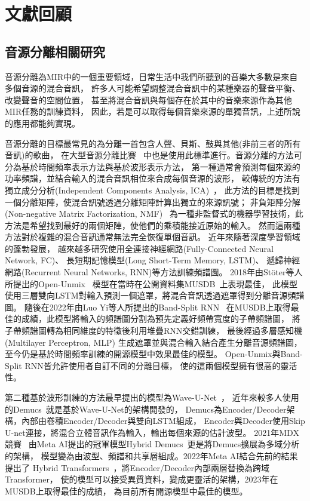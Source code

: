 \documentclass[class=NCU_thesis, crop=false]{standalone}
\begin{document}
\pagebreak

\section{文獻回顧}
\subsection{音源分離相關研究}
音源分離為MIR中的一個重要領域，日常生活中我們所聽到的音樂大多數是來自多個音源的混合音訊，
許多人可能希望調整混合音訊中的某種樂器的聲音平衡、改變聲音的空間位置，
甚至將混合音訊與每個存在於其中的音樂來源作為其他MIR任務的訓練資料，
因此，若是可以取得每個音樂來源的單獨音訊，上述所說的應用都能夠實現。

音源分離的目標最常見的為分離一首包含人聲、貝斯、鼓與其他(非前三者的所有音訊)的歌曲，
在大型音源分離比賽~\cite{Yuki_Mitsufuji2021MusicDemixing, Fabbro_Giorgio2023TheSoundDemixing}
中也是使用此標準進行。音源分離的方法可分為基於時間頻率表示方法與基於波形表示方法，
第一種通常會預測每個來源的功率頻譜，並結合輸入的混合音訊相位來合成每個音源的波形，
較傳統的方法有獨立成分分析(Independent Components Analysis, ICA)~\cite{comon1994independent}，
此方法的目標是找到一個分離矩陣，使混合訊號透過分離矩陣計算出獨立的來源訊號；
非負矩陣分解(Non-negative Matrix Factorization, NMF)~\cite{lee2000algorithms}
為一種非監督式的機器學習技術，此方法是希望找到最好的兩個矩陣，使他們的乘積能接近原始的輸入。
然而這兩種方法對於複雜的混合音訊通常無法完全恢復單個音訊。
近年來隨著深度學習領域的蓬勃發展，
越來越多研究使用全連接神經網路(Fully-Connected Neural Network, FC)、
長短期記憶模型(Long Short-Term Memory, LSTM)、
遞歸神經網路(Recurrent Neural Networks, RNN)等方法訓練頻譜圖。
2018年由Stöter等人所提出的Open-Unmix~\cite{FabianRobert_Stöter2019OpenUnmix}
模型在當時在公開資料集MUSDB~\cite{Rafii2017musdb18}上表現最佳，
此模型使用三層雙向LSTM對輸入預測一個遮罩，將混合音訊透過遮罩得到分離音源頻譜圖。
隨後在2022年由Luo Yi等人所提出的Band-Split RNN~\cite{Luo_Yi2022MusicSourceSeparation}
在MUSDB上取得最佳的成績，此模型將輸入的頻譜圖分割為預先定義好頻帶寬度的子帶頻譜圖，
將子帶頻譜圖轉為相同維度的特徵後利用堆疊RNN交錯訓練，
最後經過多層感知機(Multilayer Perceptron, MLP)
生成遮罩並與混合輸入結合產生分離音源頻譜圖，
至今仍是基於時間頻率訓練的開源模型中效果最佳的模型。
Open-Unmix與Band-Split RNN皆允許使用者自訂不同的分離目標，
使的這兩個模型擁有很高的靈活性。

第二種基於波形訓練的方法最早提出的模型為Wave-U-Net~\cite{stoller2018wave}，
近年來較多人使用的Demucs~\cite{défossez2021music}就是基於Wave-U-Net的架構開發的，
Demucs為Encoder/Decoder架構，內部由卷積Encoder/Decoder與雙向LSTM組成，
Encoder與Decoder使用Skip U-net連接，將混合立體音訊作為輸入，輸出每個來源的估計波型。
2021年MDX競賽~\cite{Yuki_Mitsufuji2021MusicDemixing}
由Meta AI提出的冠軍模型Hybrid Demucs~\cite{defossez2021hybrid}更是將Demucs擴展為多域分析的架構，
模型變為由波型、頻譜和共享層組成。2022年Meta AI結合先前的結果提出了
Hybrid Transformers~\cite{rouard2023hybrid}，將Encoder/Decoder內部兩層替換為跨域Transformer，
使的模型可以接受異質資料，變成更靈活的架構，2023年在MUSDB上取得最佳的成績，
為目前所有開源模型中最佳的模型。
\end{document}
